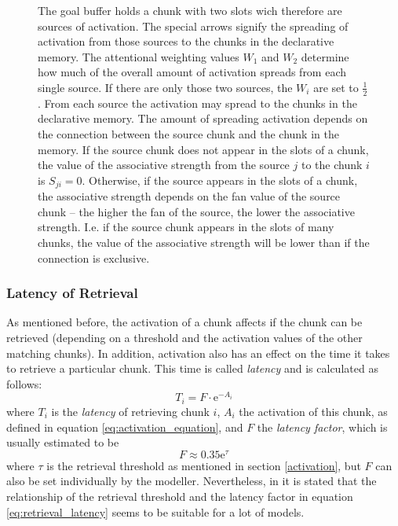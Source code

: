 \begin{figure}[htb]
\caption{The goal buffer holds a chunk with two slots wich therefore are sources of activation. The special arrows signify the spreading of activation from those sources to the chunks in the declarative memory. The attentional weighting values $W_1$ and $W_2$ determine how much of the overall amount of activation spreads from each single source. If there are only those two sources, the $W_i$ are set to $\frac{1}{2}$. From each source the activation may spread to the chunks in the declarative memory. The amount of spreading activation depends on the connection between the source chunk and the chunk in the memory. If the source chunk does not appear in the slots of a chunk, the value of the associative strength from the source $j$ to the chunk $i$ is $S_{ji} = 0$. Otherwise, if the source appears in the slots of a chunk, the associative strength depends on the fan value of the source chunk -- the higher the fan of the source, the lower the associative strength. I.e. if the source chunk appears in the slots of many chunks, the value of the associative strength will be lower than if the connection is exclusive. \cite[unit 5]{actr_tutorial}}
\label{fig:activation_spreading}
\end{figure}

\subsubsection{Latency of Retrieval}

As mentioned before, the activation of a chunk affects if the chunk can be retrieved (depending on a threshold and the activation values of the other matching chunks). In addition, activation also has an effect on the time it takes to retrieve a particular chunk. This time is called \emph{latency} and is calculated as follows:
\begin{equation}
\label{eq:retrieval_latency}
T_i = F \cdot \mathrm{e}^{-A_i}
\end{equation}
where $T_i$ is the \emph{latency} of retrieving chunk $i$, $A_i$ the activation of this chunk, as defined in equation \eqref{eq:activation_equation}, and $F$ the \emph{latency factor}, which is usually estimated to be
\begin{equation}
F \approx 0.35\mathrm{e}^\tau
\end{equation}
where $\tau$ is the retrieval threshold as mentioned in section \ref{activation}, but $F$ can also be set individually by the modeller. Nevertheless, in \cite[1042]{anderson_integrated_2004} it is stated that the relationship of the retrieval threshold and the latency factor in equation \eqref{eq:retrieval_latency} seems to be suitable for a lot of models.

